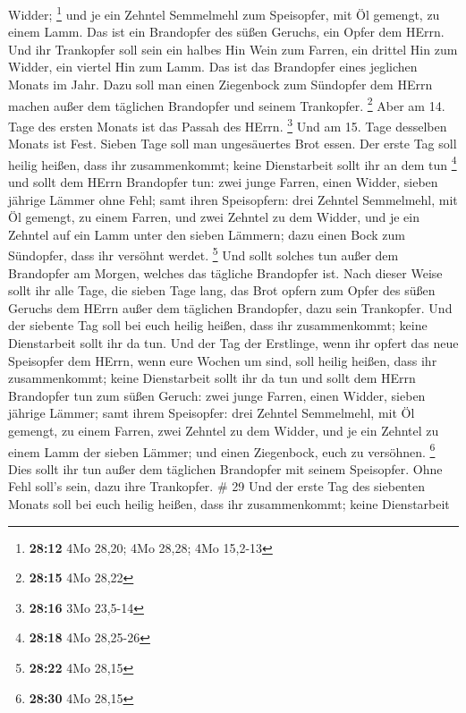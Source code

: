 Widder; \footnote{\textbf{28:12} 4Mo 28,20; 4Mo 28,28; 4Mo 15,2-13}
 und je ein Zehntel Semmelmehl zum Speisopfer, mit Öl
gemengt, zu einem Lamm. Das ist ein Brandopfer des süßen Geruchs, ein
Opfer dem HErrn.  Und ihr Trankopfer soll sein ein halbes
Hin Wein zum Farren, ein drittel Hin zum Widder, ein viertel Hin zum
Lamm. Das ist das Brandopfer eines jeglichen Monats im Jahr.
 Dazu soll man einen Ziegenbock zum Sündopfer dem HErrn
machen außer dem täglichen Brandopfer und seinem Trankopfer. \footnote{\textbf{28:15}
  4Mo 28,22}  Aber am 14. Tage des ersten Monats ist das
Passah des HErrn. \footnote{\textbf{28:16} 3Mo 23,5-14} 
Und am 15. Tage desselben Monats ist Fest. Sieben Tage soll man
ungesäuertes Brot essen.  Der erste Tag soll heilig heißen,
dass ihr zusammenkommt; keine Dienstarbeit sollt ihr an dem tun
\footnote{\textbf{28:18} 4Mo 28,25-26}  und sollt dem HErrn
Brandopfer tun: zwei junge Farren, einen Widder, sieben jährige Lämmer
ohne Fehl;  samt ihren Speisopfern: drei Zehntel
Semmelmehl, mit Öl gemengt, zu einem Farren, und zwei Zehntel zu dem
Widder,  und je ein Zehntel auf ein Lamm unter den sieben
Lämmern;  dazu einen Bock zum Sündopfer, dass ihr versöhnt
werdet. \footnote{\textbf{28:22} 4Mo 28,15}  Und sollt
solches tun außer dem Brandopfer am Morgen, welches das tägliche
Brandopfer ist.  Nach dieser Weise sollt ihr alle Tage, die
sieben Tage lang, das Brot opfern zum Opfer des süßen Geruchs dem HErrn
außer dem täglichen Brandopfer, dazu sein Trankopfer.  Und
der siebente Tag soll bei euch heilig heißen, dass ihr zusammenkommt;
keine Dienstarbeit sollt ihr da tun.  Und der Tag der
Erstlinge, wenn ihr opfert das neue Speisopfer dem HErrn, wenn eure
Wochen um sind, soll heilig heißen, dass ihr zusammenkommt; keine
Dienstarbeit sollt ihr da tun  und sollt dem HErrn
Brandopfer tun zum süßen Geruch: zwei junge Farren, einen Widder, sieben
jährige Lämmer;  samt ihrem Speisopfer: drei Zehntel
Semmelmehl, mit Öl gemengt, zu einem Farren, zwei Zehntel zu dem Widder,
 und je ein Zehntel zu einem Lamm der sieben Lämmer;
 und einen Ziegenbock, euch zu versöhnen. \footnote{\textbf{28:30}
  4Mo 28,15}  Dies sollt ihr tun außer dem täglichen
Brandopfer mit seinem Speisopfer. Ohne Fehl soll's sein, dazu ihre
Trankopfer. \# 29  Und der erste Tag des siebenten Monats
soll bei euch heilig heißen, dass ihr zusammenkommt; keine Dienstarbeit
